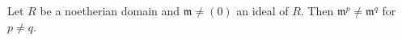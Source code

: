 Let $R$ be a noetherian domain and $\mathfrak{m} \neq (0)$ an ideal of $R$. Then $\mathfrak{m}^p \neq \mathfrak{m}^q$ for $p \neq q$.
